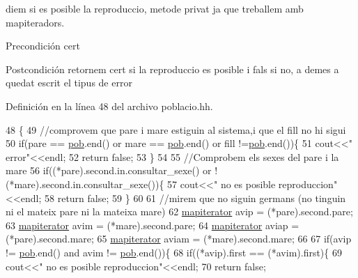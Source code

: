diem si es posible la reproduccio, metode privat ja que treballem amb mapiteradors. 

\begin{DoxyPrecond}{Precondición}
cert 
\end{DoxyPrecond}
\begin{DoxyPostcond}{Postcondición}
retornem cert si la reproduccio es posible i fals si no, a demes a quedat escrit el tipus de error 
\end{DoxyPostcond}


Definición en la línea 48 del archivo poblacio.\+hh.


\begin{DoxyCode}
48                                                                                 \{
49     \textcolor{comment}{//comprovem que pare i mare estiguin al sistema,i que el fill no hi sigui}
50     \textcolor{keywordflow}{if}(pare == \hyperlink{classpoblacio_a7ecb70033b151a937143b07d489c4c17}{pob}.end() or mare == \hyperlink{classpoblacio_a7ecb70033b151a937143b07d489c4c17}{pob}.end() or fill !=\hyperlink{classpoblacio_a7ecb70033b151a937143b07d489c4c17}{pob}.end())\{
51       cout<<\textcolor{stringliteral}{"  error"}<<endl;
52       \textcolor{keywordflow}{return} \textcolor{keyword}{false};
53     \}
54 
55     \textcolor{comment}{//Comprobem els sexes del pare i la mare}
56     \textcolor{keywordflow}{if}((*pare).second.in.consultar\_sexe() or !(*mare).second.in.consultar\_sexe())\{
57       cout<<\textcolor{stringliteral}{"  no es posible reproduccion"}<<endl;
58       \textcolor{keywordflow}{return} \textcolor{keyword}{false};
59     \}
60 
61     \textcolor{comment}{//mirem que no siguin germans (no tinguin ni el mateix pare ni la mateixa mare)}
62     \hyperlink{classpoblacio_a52c3d96b08f7679f27487e7499185ed1}{mapiterator} avip = (*pare).second.pare;
63     \hyperlink{classpoblacio_a52c3d96b08f7679f27487e7499185ed1}{mapiterator} avim = (*mare).second.pare;
64     \hyperlink{classpoblacio_a52c3d96b08f7679f27487e7499185ed1}{mapiterator} aviap = (*pare).second.mare;
65     \hyperlink{classpoblacio_a52c3d96b08f7679f27487e7499185ed1}{mapiterator} aviam = (*mare).second.mare;
66 
67     \textcolor{keywordflow}{if}(avip != \hyperlink{classpoblacio_a7ecb70033b151a937143b07d489c4c17}{pob}.end() and avim != \hyperlink{classpoblacio_a7ecb70033b151a937143b07d489c4c17}{pob}.end())\{
68       \textcolor{keywordflow}{if}((*avip).first == (*avim).first)\{
69         cout<<\textcolor{stringliteral}{"  no es posible reproduccion"}<<endl;
70         \textcolor{keywordflow}{return} \textcolor{keyword}{false};

\end{DoxyCode}
